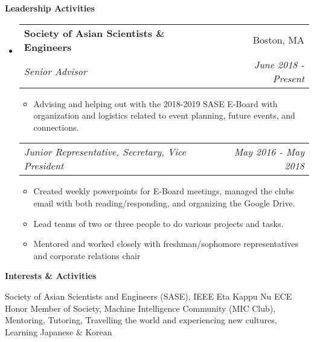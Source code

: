 \documentclass[letterpaper, 8pt]{extarticle}
\makeatletter
\newcommand{\resitem}[1]{\item #1 \vspace{-2pt}}
\newcommand{\resheading}[1]{{\large \colorbox{mygrey}{\begin{minipage}{0.99\textwidth}{\textbf{#1 \vphantom{p\^{E}}}}\end{minipage}}}}
\newcommand{\ressubheading}[4]{
\begin{tabular*}{7.40in}{l@{\extracolsep{\fill}}r}
		\textbf{#1} & #2 \\
		\textit{#3} & \textit{#4} \\
\end{tabular*}\vspace{-6pt}}
\newcommand{\rehead}[2]{
\begin{tabular*}{7.40in}{l@{\extracolsep{\fill}}r}
        \textit{#1} & \textit{#2} \\
\end{tabular*}\vspace{-6pt}}
\makeatother
\begin{document}
\resheading{Leadership Activities}
\begin{itemize}
    \item 	\ressubheading{Society of Asian Scientists \& Engineers}{Boston, MA}{Senior Advisor}{June 2018 - Present}
    \begin{itemize} 
        \item Advising and helping out with the 2018-2019 SASE E-Board with organization and logistics related to event planning, future events, and connections.
    \end{itemize} \vspace{-6pt}
    \rehead{Junior Representative, Secretary, Vice President}{May 2016 - May 2018}
    \begin{itemize} 
        \resitem{Created weekly powerpoints for E-Board meetings, managed the clubs email with both reading/responding, and organizing the Google Drive.}
        \resitem{Lead teams of two or three people to do various projects and tasks.}
        \resitem{Mentored and worked closely with freshman/sophomore representatives and corporate relations chair}
    \end{itemize}
\end{itemize}

\resheading{Interests \& Activities}
Society of Asian Scientists and Engineers (SASE), IEEE Eta Kappu Nu ECE Honor Member of Society, Machine Intelligence Community (MIC Club), Mentoring, Tutoring, Travelling the world and experiencing new cultures, Learning Japanese \& Korean



\begin{comment}
\pagebreak

\resheading{Publications}

\begin{description}
\item["Security-Enhanced Darwin: Porting SELinux to Mac OS X",]
\emph{Proceedings from the Third Annual Security Enhanced Linux Symposium} in Baltimore, MD, 2007.
\item["{\sc \bf UNIX} System Administration Handbook, Third Edition",]
contributing author.
\item["strlcpy and strlcat:  Consistent, Safe, String Copy and Concatenation",]
\emph{Proceedings from the USENIX Annual Technical Conference} in Monterey, CA, 1999.
\item["satool:  A System Administrators Cockpit",]
\emph{Proceedings from the USENIX LISA VII Conference (Large Installation Systems Administration)} in Monterey, CA, 1993.
\end{description}

\resheading{Patents}

\begin{description}
\item[Furlong, Wesley J., Schlossnagle, George, Miller, Todd.  2014.]
Method and system for adaptive delivery of digital messages.
U.S. Patent 8,782,184 filed September 20, 2013, and issued July 15, 2014.
\end{description}
\end{comment}
\end{document}

